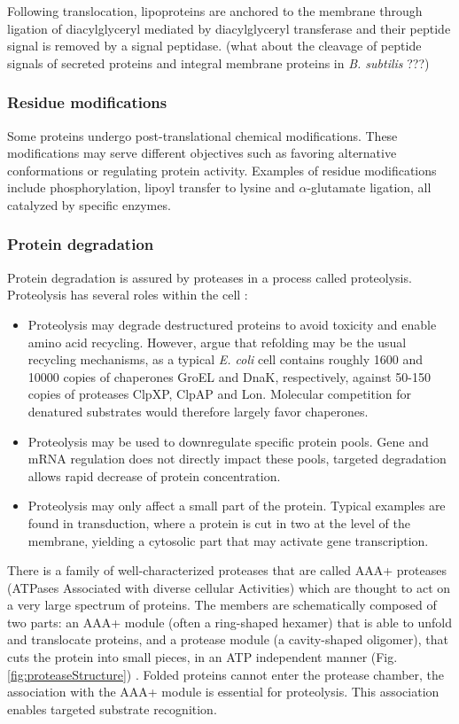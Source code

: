 Following translocation, lipoproteins are anchored to the membrane through ligation of diacylglyceryl mediated by diacylglyceryl transferase and their peptide signal is removed by a signal peptidase. (what about the cleavage of peptide signals of secreted proteins and integral membrane proteins in \textit{B. subtilis} ???)


\subsubsection{Residue modifications}

Some proteins undergo post-translational chemical modifications. These modifications may serve different objectives such as favoring alternative conformations or regulating protein activity. Examples of residue modifications include phosphorylation, lipoyl transfer to lysine and $\alpha$-glutamate ligation, all catalyzed by specific enzymes.

\subsubsection{Protein degradation}

Protein degradation is assured by proteases in a process called proteolysis. Proteolysis has several roles within the cell \citep{gur_regulated_2011,konovalova_regulated_2014}:
\begin{itemize}
	\item Proteolysis may degrade destructured proteins to avoid toxicity and enable amino acid recycling. However, \citet{gur_regulated_2011} argue that refolding may be the usual recycling mechanisms, as a typical \textit{E. coli} cell contains roughly 1600 and 10000 copies of chaperones GroEL and DnaK, respectively, against 50-150 copies of proteases ClpXP, ClpAP and Lon. Molecular competition for denatured substrates would therefore largely favor chaperones.
	\item Proteolysis may be used to downregulate specific protein pools. Gene and mRNA regulation does not directly impact these pools, targeted degradation allows rapid decrease of protein concentration.
	\item Proteolysis may only affect a small part of the protein. Typical examples are found in transduction, where a protein is cut in two at the level of the membrane, yielding a cytosolic part that may activate gene transcription.
\end{itemize}

There is a family of well-characterized proteases that are called AAA+ proteases (ATPases Associated with diverse cellular Activities) which are thought to act on a very large spectrum of proteins. The members are schematically composed of two parts: an AAA+ module (often a ring-shaped hexamer) that is able to unfold and translocate proteins, and a protease module (a cavity-shaped oligomer), that cuts the protein into small pieces, in an ATP independent manner (Fig. \ref{fig:proteaseStructure}) \citep{sauer_aaa+_2011}. Folded proteins cannot enter the protease chamber, the association with the AAA+ module is essential for proteolysis. This association enables targeted substrate recognition.

